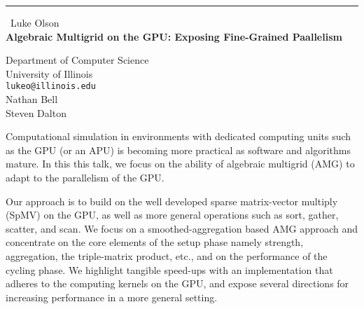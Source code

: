 \documentclass{report}
\begin{document}
\begin{center}
\rule{6in}{1pt} \
{\large Luke Olson \\
{\bf Algebraic Multigrid on the GPU: Exposing Fine-Grained Paallelism}}

Department of Computer Science \\ University of Illinois
\\
{\tt lukeo@illinois.edu}\\
Nathan Bell\\
Steven Dalton\end{center}

Computational simulation in environments with dedicated computing units such
as the GPU (or an APU) is becoming more practical as software and algorithms
mature. In this this talk, we focus on the ability of algebraic multigrid
(AMG) to adapt to the parallelism of the GPU.

Our approach is to build on the well developed sparse matrix-vector multiply
(SpMV) on the GPU, as well as more general operations such as sort, gather,
scatter, and scan. We focus on a smoothed-aggregation based AMG approach
and concentrate on the core elements of the setup phase namely strength,
aggregation, the triple-matrix product, etc., and on the performance of the
cycling phase. We highlight tangible speed-ups with an implementation that
adheres to the computing kernels on the GPU, and expose several directions
for increasing performance in a more general setting.
\end{document}
